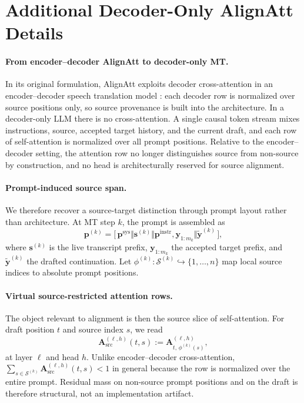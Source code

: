 \documentclass[11pt]{article}
\begin{document}
\section{Additional Decoder-Only AlignAtt Details}
\label{sec:appendix-alignatt}
\label{sec:alignatt-llm}

\paragraph{From encoder--decoder AlignAtt to decoder-only MT.}
In its original formulation, AlignAtt exploits decoder cross-attention in an
encoder--decoder speech translation model \citep{alignatt23}: each decoder row
is normalized over source positions only, so source provenance is built into
the architecture. In a decoder-only LLM there is no cross-attention. A single
causal token stream mixes instructions, source, accepted target history, and
the current draft, and each row of self-attention is normalized over all prompt
positions. Relative to the encoder--decoder setting, the attention row no
longer distinguishes source from non-source by construction, and no head is
architecturally reserved for source alignment.

\paragraph{Prompt-induced source span.}
We therefore recover a source-target distinction through prompt layout rather
than architecture. At MT step $k$, the prompt is assembled as
\begin{equation}
  \mathbf{p}^{(k)} = \bigl[\,
  \mathbf{p}^{\mathrm{sys}}
  \Vert \mathbf{s}^{(k)}
  \Vert \mathbf{p}^{\mathrm{instr}}, \mathbf{y}_{1:m_k}
  \Vert \widetilde{\mathbf{y}}^{(k)} \,\bigr],
  \label{eq:layout}
\end{equation}
where $\mathbf{s}^{(k)}$ is the live transcript prefix,
$\mathbf{y}_{1:m_k}$ the accepted target prefix, and
$\widetilde{\mathbf{y}}^{(k)}$ the drafted continuation. Let
$\phi^{(k)} : \mathcal{S}^{(k)} \hookrightarrow \{1,\ldots,n\}$ map local
source indices to absolute prompt positions.

\paragraph{Virtual source-restricted attention rows.}
The object relevant to alignment is then the source slice of
self-attention. For draft position $t$ and source index $s$, we read
\begin{equation}
  \mathbf{A}^{(\ell,h)}_{\mathrm{src}}(t,s)
  := \mathbf{A}^{(\ell,h)}_{t,\,\phi^{(k)}(s)},
  \label{eq:virtual-xattn}
\end{equation}
at layer $\ell$ and head $h$. Unlike encoder--decoder cross-attention,
$\sum_{s \in \mathcal{S}^{(k)}} \mathbf{A}^{(\ell,h)}_{\mathrm{src}}(t,s) < 1$
in general because the row is normalized over the entire prompt. Residual mass
on non-source prompt positions and on the draft is therefore structural, not an
implementation artifact.
\end{document}
